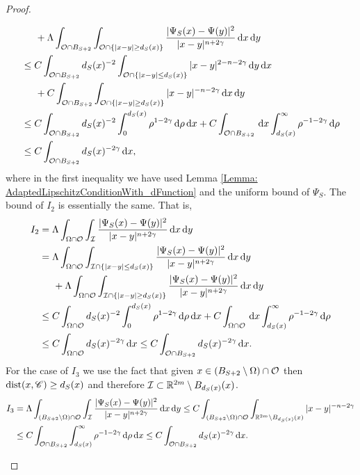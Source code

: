 \begin{proof}
\begin{itemize}
\begin{align*}
&\hspace{5mm} + \Lambda \int_{\mathcal{O} \cap B_{S+2}} \int_{\mathcal{O}\cap\{|x-y|\geq d_S(x)\}} \frac{|\Psi_S(x)-\Psi(y)|^2}{|x-y|^{n+2\gamma}} \,\mathrm{d} x\,\mathrm{d} y\\
&\leq C \int_{\mathcal{O} \cap B_{S+2}} d_S(x)^{-2}\int_{\mathcal{O}\cap\{|x-y|\leq d_S(x)\}} |x-y|^{2-n-2\gamma} \,\mathrm{d} y\,\mathrm{d} x\\
&\hspace{5mm} + C \int_{\mathcal{O} \cap B_{S+2}} \int_{\mathcal{O}\cap\{|x-y|\geq d_S(x)\}} |x-y|^{-n-2\gamma} \,\mathrm{d} x\,\mathrm{d} y\\
&\leq C \int_{\mathcal{O} \cap B_{S+2}} d_S(x)^{-2}\int_0^{d_S(x)} \rho^{1-2\gamma} \,\mathrm{d} \rho\,\mathrm{d} x + C \int_{\mathcal{O} \cap B_{S+2}} \,\mathrm{d} x \int_{d_S(x)}^\infty \rho^{-1-2\gamma} \,\mathrm{d}\rho\\
&\leq C \int_{\mathcal{O} \cap B_{S+2}} d_S(x)^{-2\gamma} \,\mathrm{d} x,
\end{align*}
where in the first inequality we have used Lemma \ref{Lemma: AdaptedLipschitzConditionWith_dFunction} and the uniform bound of $\Psi_S$. The bound of $I_2$ is essentially the same. That is,
\begin{align*}
I_2 &= \Lambda \int_{\Omega \cap \mathcal{O}} \int_{\mathcal{I}} \frac{|\Psi_S(x)-\Psi(y)|^2}{|x-y|^{n+2\gamma}} \,\mathrm{d} x\,\mathrm{d} y\\
&= \Lambda \int_{\Omega \cap \mathcal{O}} \int_{\mathcal{I}\cap\{|x-y|\leq d_S(x)\}} \frac{|\Psi_S(x)-\Psi(y)|^2}{|x-y|^{n+2\gamma}} \,\mathrm{d} x\,\mathrm{d} y\\
&\hspace{5mm} + \Lambda \int_{\Omega \cap \mathcal{O}} \int_{\mathcal{I}\cap\{|x-y|\geq d_S(x)\}} \frac{|\Psi_S(x)-\Psi(y)|^2}{|x-y|^{n+2\gamma}} \,\mathrm{d} x\,\mathrm{d} y\\
&\leq C \int_{\Omega \cap \mathcal{O}} d_S(x)^{-2}\int_0^{d_S(x)} \rho^{1-2\gamma} \,\mathrm{d} \rho\,\mathrm{d} x + C \int_{\Omega \cap \mathcal{O}} \,\mathrm{d} x \int_{d_S(x)}^\infty \rho^{-1-2\gamma} \,\mathrm{d}\rho\\
&\leq C \int_{\Omega \cap \mathcal{O}} d_S(x)^{-2\gamma} \,\mathrm{d} x \leq C \int_{\mathcal{O} \cap B_{S+2}} d_S(x)^{-2\gamma} \,\mathrm{d} x.
\end{align*}
For the case of $I_3$ we use the fact that given $x\in (B_{S+2}\setminus \Omega)\cap \mathcal{O}$ then $\operatorname{dist}(x,\mathscr{C})\geq d_S(x)$ and therefore $\mathcal{I} \subset \mathbb{R}^{2m}\setminus B_{d_S(x)}(x)$.
\begin{align*}
I_3 &= \Lambda \int_{(B_{S+2}\setminus \Omega) \cap \ocal} \int_{\ical} \frac{|\Psi_S(x)-\Psi(y)|^2}{|x-y|^{n+2\s}} \d x\d y \leq C \int_{(B_{S+2}\setminus \Omega) \cap \ocal} \int_{\R^{2m}\setminus B_{d_S(x)}(x)} |x-y|^{-n-2\s} \\
&\leq C \int_{\ocal \cap B_{S+2}} \int_{d_S(x)}^\infty \rho^{-1-2\s} \d \rho\d x \leq C \int_{\ocal \cap B_{S+2}} d_S(x)^{-2\s} \d x.

\end{align*}
\end{itemize}
\end{proof}

